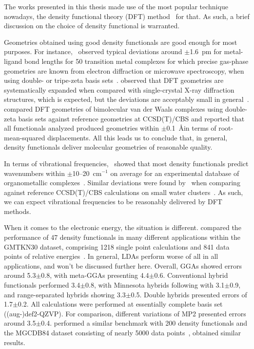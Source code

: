 The works presented in this thesis made use of the most popular technique nowadays,
the density functional theory (DFT)
method~\cite{Hohenberg_1964,Kohn_1965,Perdew_2014,Kryachko_2014,Yu_2016} for
that.
As such,
a brief discussion on the choice of density functional is warranted.

Geometries obtained using good density functionals are good enough
for most purposes.
For instance,~\citeauthor{Bühl_2006} observed typical deviations around $\pm$1.6~pm for
metal-ligand bond lengths for 50 transition metal complexes for which precise gas-phase geometries
are known from electron diffraction or microwave spectroscopy,
when using double- or tripe-zeta basis sets~\cite{Bühl_2006}.
\citeauthor{Minenkov_2012} observed that
DFT geometries are systematically expanded when compared with single-crystal
X-ray diffraction structures,
which is expected,
but the deviations are
acceptably small in general~\cite{Minenkov_2012}.
\citeauthor{Sirianni_2018} compared DFT geometries of bimolecular van der Waals complexes using
double-zeta basis sets against reference geometries at CCSD(T)/CBS
and reported that all functionals analyzed produced
geometries within $\pm$0.1~\AA in terms
of root-mean-squared displacements.
All this leads us to conclude that,
in general,
density functionals deliver molecular geometries of reasonable quality.

In terms of vibrational frequencies,~\citeauthor{Katari_2017} showed that most density functionals
predict wavenumbers within $\pm$10--20~cm$^{-1}$ on average for
an experimental database of organometallic complexes~\cite{Katari_2017}.
Similar deviations were found by~\citeauthor{Howard_2015}
when comparing against reference CCSD(T)/CBS calculations on
small water clusters~\cite{Howard_2015}.
As such,
we can expect vibrational frequencies to be reasonably delivered
by DFT methods.

When it comes to the electronic energy,
the situation is different.
\citeauthor{Goerigk_2011} compared the performance of 47 density functionals
in many different applications
within the GMTKN30 dataset,
comprising 1218 single point calculations
and 841 data points of relative energies~\cite{Goerigk_2011}.
In general,
LDAs perform worse of all in all applications,
and won't be discussed further here.
Overall,
GGAs showed errors around 5.3$\pm$0.8\kcalmol,
with meta-GGAs presenting 4.4$\pm$0.6\kcalmol.
Conventional hybrid functionals performed 3.4$\pm$0.8\kcalmol,
with Minnesota hybrids following with 3.1$\pm$0.9\kcalmol,
and range-separated hybrids showing 3.3$\pm$0.5\kcalmol.
Double hybrids presented errors of 1.7$\pm$0.2\kcalmol.
All calculations were performed at essentially complete basis set
((aug-)def2-QZVP).
For comparison,
different variations of MP2
presented errors around 3.5$\pm$0.4\kcalmol.
\citeauthor{Mardirossian_2017} performed a similar
benchmark with 200 density functionals and the MGCDB84 dataset
consisting of nearly 5000 data points~\cite{Mardirossian_2017},
obtained similar results.

